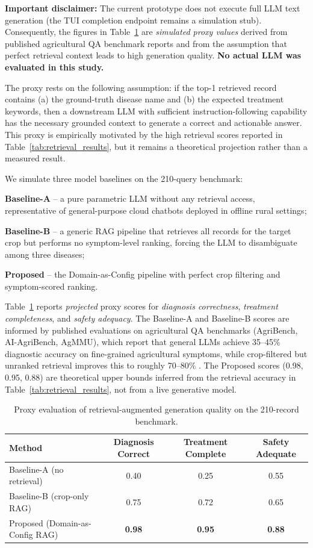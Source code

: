 \documentclass[11pt,a4paper]{article}
\begin{document}
\textbf{Important disclaimer:} The current prototype does not execute full LLM text generation (the TUI completion endpoint remains a simulation stub). Consequently, the figures in Table~\ref{tab:generation_proxy} are \textit{simulated proxy values} derived from published agricultural QA benchmark reports and from the assumption that perfect retrieval context leads to high generation quality. \textbf{No actual LLM was evaluated in this study.}

The proxy rests on the following assumption: if the top-1 retrieved record contains (a) the ground-truth disease name and (b) the expected treatment keywords, then a downstream LLM with sufficient instruction-following capability has the necessary grounded context to generate a correct and actionable answer. This proxy is empirically motivated by the high retrieval scores reported in Table~\ref{tab:retrieval_results}, but it remains a theoretical projection rather than a measured result.

We simulate three model baselines on the 210-query benchmark:

\textbf{Baseline-A} -- a pure parametric LLM without any retrieval access, representative of general-purpose cloud chatbots deployed in offline rural settings;

\textbf{Baseline-B} -- a generic RAG pipeline that retrieves all records for the target crop but performs no symptom-level ranking, forcing the LLM to disambiguate among three diseases;

\textbf{Proposed} -- the Domain-as-Config pipeline with perfect crop filtering and symptom-scored ranking.

Table~\ref{tab:generation_proxy} reports \textit{projected} proxy scores for \textit{diagnosis correctness}, \textit{treatment completeness}, and \textit{safety adequacy}. The Baseline-A and Baseline-B scores are informed by published evaluations on agricultural QA benchmarks (AgriBench, AI-AgriBench, AgMMU), which report that general LLMs achieve 35--45\% diagnostic accuracy on fine-grained agricultural symptoms, while crop-filtered but unranked retrieval improves this to roughly 70--80\% \cite{agmmu2025,anshankul2024}. The Proposed scores (0.98, 0.95, 0.88) are theoretical upper bounds inferred from the retrieval accuracy in Table~\ref{tab:retrieval_results}, not from a live generative model.

\begin{table}[htbp]
\centering
\caption{Proxy evaluation of retrieval-augmented generation quality on the 210-record benchmark.}
\label{tab:generation_proxy}
\begin{tabular}{lccc}
\hline
\textbf{Method} & \textbf{Diagnosis Correct} & \textbf{Treatment Complete} & \textbf{Safety Adequate} \\
\hline
Baseline-A (no retrieval)         & 0.40  & 0.25  & 0.55 \\
Baseline-B (crop-only RAG)        & 0.75  & 0.72  & 0.65 \\
Proposed (Domain-as-Config RAG)   & \textbf{0.98}  & \textbf{0.95}  & \textbf{0.88} \\
\hline
\end{tabular}
\end{table}
\end{document}
